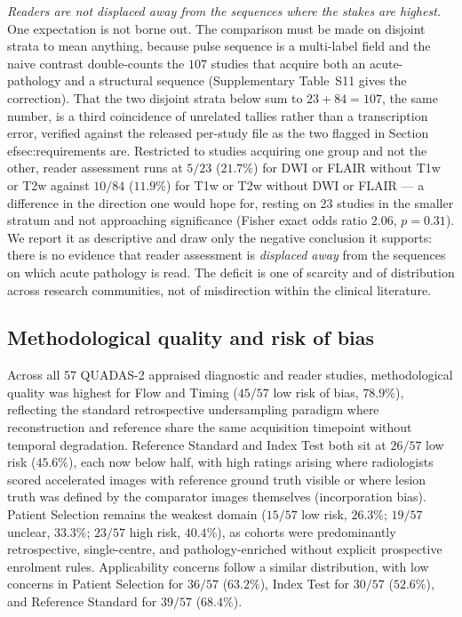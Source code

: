 \documentclass[review,authoryear]{elsarticle}
\begin{document}
\emph{Readers are not displaced away from the sequences where the stakes are highest.}
One expectation is not borne out. The comparison must be made on disjoint strata to mean
anything, because pulse sequence is a multi-label field and the naive contrast
double-counts the $107$ studies that acquire both an acute-pathology and a structural
sequence (Supplementary Table~S11 gives the correction). That the two disjoint strata below sum to $23+84=107$, the same number, is a third coincidence of unrelated tallies rather than a transcription error, verified against the released per-study file as the two flagged in Section~
ef{sec:requirements} are. Restricted to studies acquiring
one group and not the other, reader assessment runs at $5/23$ ($21.7\%$) for DWI or
FLAIR without T1w or T2w against $10/84$ ($11.9\%$) for T1w or T2w without DWI or FLAIR
--- a difference in the direction one would hope for, resting on 23 studies in the
smaller stratum and not approaching significance (Fisher exact odds ratio $2.06$,
$p=0.31$). We report it as descriptive and draw only the negative conclusion it
supports: there is no evidence that reader assessment is \emph{displaced away} from the
sequences on which acute pathology is read. The deficit is one of scarcity and of
distribution across research communities, not of misdirection within the clinical
literature.

\subsection{Methodological quality and risk of bias}
Across all 57 QUADAS-2 appraised diagnostic and reader studies, methodological quality was highest for Flow and Timing ($45/57$ low risk of bias, $78.9\%$), reflecting the standard retrospective undersampling paradigm where reconstruction and reference share the same acquisition timepoint without temporal degradation. Reference Standard and Index Test both sit at $26/57$ low risk ($45.6\%$), each now below half, with high ratings arising where radiologists scored accelerated images with reference ground truth visible or where lesion truth was defined by the comparator images themselves (incorporation bias). Patient Selection remains the weakest domain ($15/57$ low risk, $26.3\%$; $19/57$ unclear, $33.3\%$; $23/57$ high risk, $40.4\%$), as cohorts were predominantly retrospective, single-centre, and pathology-enriched without explicit prospective enrolment rules. Applicability concerns follow a similar distribution, with low concerns in Patient Selection for $36/57$ ($63.2\%$), Index Test for $30/57$ ($52.6\%$), and Reference Standard for $39/57$ ($68.4\%$).
\end{document}
